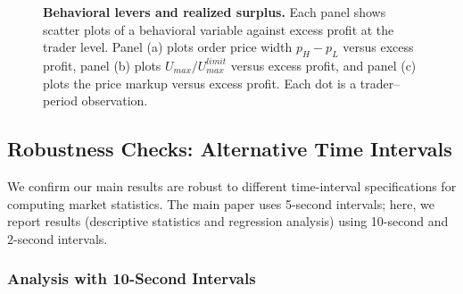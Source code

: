 \documentclass[12pt]{article}
\begin{document}
\begin{singlespace}
\begin{figure}[H]
    \caption{\textbf{Behavioral levers and realized surplus.}
             Each panel shows scatter plots of a behavioral variable against excess
             profit at the trader level. Panel (a) plots order price width \(p_H-p_L\) versus excess profit, panel (b) plots $U_{max}/U^{limit}_{max}$ versus excess profit, and panel (c) plots the price markup versus excess profit. Each dot is a trader–period observation.}
    \label{fig:app_excess-profit-correlations}
\end{figure}

\newpage

\subsection{Robustness Checks: Alternative Time Intervals}

We confirm our main results are robust to different time-interval specifications for computing market statistics. The main paper uses 5-second intervals; here, we report results (descriptive statistics and regression analysis) using 10-second and 2-second intervals.

\subsubsection{Analysis with 10-Second Intervals}

\begin{table}[H]
    \centering
    \caption{Summary Statistics: Market Performance}
    \renewcommand{\arraystretch}{1.1}
\end{table}
\end{singlespace}
\end{document}
